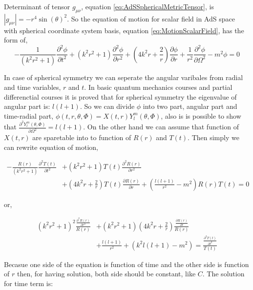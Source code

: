 Determinant of tensor $g_{\mu\nu}$, equation \ref{eq:AdSSphericalMetricTensor}, is $|g_{\mu\nu}| = - r^4 \sin{(\theta)}^2$. So the equation of motion for scalar field in AdS space with spherical coordinate system basis, equation \ref{eq:MotionScalarField}, has the form of,\\

\begin{equation} \label{eq:AdSSphericalScalarFieldEq}
    - \frac{1}{\left( k^2r^2 + 1\right)} \frac{\partial^2\phi}{\partial t^2} + (k^2r^2+1) \frac{\partial^2\phi}{\partial r^2} + (4k^2r+\frac{2}{r})\frac{\partial\phi}{\partial r} + \frac{1}{r^2} \frac{\partial^2 \phi}{\partial \Omega^2} - m^2\phi =0 \nonumber
\end{equation}

In case of spherical symmetry we can seperate the angular varibales from radial and time variables, $r$ and $t$. In basic quantum mechanics courses and partial differenctial courses it is proved that for spherical symmetry the eigenvalue of angular part is: $l(l+1)$. So we can divide $\phi$ into two part, angular part and time-radial part, $\phi(t,r,\theta,\Phi) = X(t,r)Y^m_l(\theta,\Phi)$, also is is possible to show that $\frac{\partial^2 Y^m_l(\theta,\Phi)}{\partial \Omega^2} = l(l+1)$. On the other hand we can assume that function of $X(t,r)$ are sparetable into to function of $R(r)$ and $T(t)$. Then simply we can rewrite equation of motion,

\begin{align}
    - \frac{R(r)}{\left( k^2r^2 + 1\right)} \frac{\partial^2T(t)}{\partial t^2} &+ (k^2r^2+1) T(t) \frac{\partial^2 R(r)}{\partial r^2} \\
    & + (4k^2r+\frac{2}{r})T(t)\frac{\partial R(r)}{\partial r} + (\frac{l(l+1)}{r^2} - m^2)R(r)T(t) = 0 \nonumber
\end{align}

or,

\begin{align}
    (k^2r^2+1)^2 \frac{\frac{\partial^2 R(r)}{\partial r^2}}{R(r)} &+ (k^2r^2 + 1)(4k^2r+\frac{2}{r})\frac{\frac{\partial R(r)}{\partial r}}{R(r)} \\
     &+ \frac{l(l+1)}{r^2} + (k^2l(l+1)- m^2)= \frac{\frac{\partial^2T(t)}{\partial t^2}}{T(t)} \nonumber
\end{align}

Becasue one side of the equation is function of time and the other side is function of $r$ then, for having solution, both side should be constant, like $C$. The solution for time term is:


